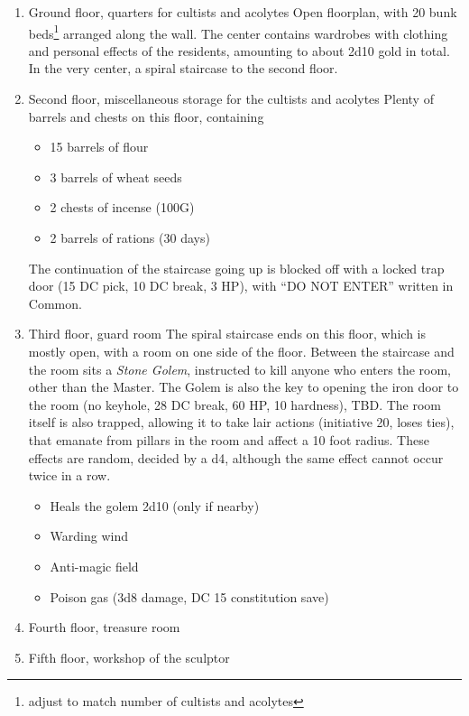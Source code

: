 \begin{enumerate}
\item Ground floor, quarters for cultists and acolytes
Open floorplan, with 20 bunk beds\footnote{adjust to match number of cultists and acolytes} arranged along the wall. The center contains wardrobes with clothing and personal effects of the residents, amounting to about 2d10 gold in total. In the very center, a spiral staircase to the second floor.

\item Second floor, miscellaneous storage for the cultists and acolytes
Plenty of barrels and chests on this floor, containing 
\begin{itemize}
\item 15 barrels of flour
\item 3 barrels of wheat seeds
\item 2 chests of incense (100G)
\item 2 barrels of rations (30 days)
\end{itemize}
The continuation of the staircase going up is blocked off with a locked trap door (15 DC pick, 10 DC break, 3 HP), with ``DO NOT ENTER'' written in Common.
\item Third floor, guard room
The spiral staircase ends on this floor, which is mostly open, with a room on one side of the floor. Between the staircase and the room sits a \textit{Stone Golem}, instructed to kill anyone who enters the room, other than the Master. The Golem is also the key to opening the iron door to the room (no keyhole, 28 DC break, 60 HP, 10 hardness), TBD. The room itself is also trapped, allowing it to take lair actions (initiative 20, loses ties), that emanate from pillars in the room and affect a 10 foot radius. These effects are random, decided by a d4, although the same effect cannot occur twice in a row.
\begin{itemize}
\item Heals the golem 2d10 (only if nearby)
\item Warding wind
\item Anti-magic field
\item Poison gas (3d8 damage, DC 15 constitution save)
\end{itemize}
\item Fourth floor, treasure room
\item Fifth floor, workshop of the sculptor
\end{enumerate}